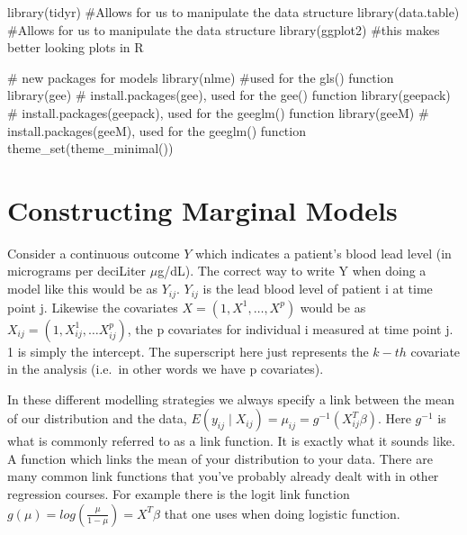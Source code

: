 \documentclass[
  letterpaper,
  DIV=11,
  numbers=noendperiod]{scrreprt}
\newenvironment{Shaded}{\begin{snugshade}}{\end{snugshade}}
\newcommand{\CommentTok}[1]{\textcolor[rgb]{0.37,0.37,0.37}{#1}}
\newcommand{\FunctionTok}[1]{\textcolor[rgb]{0.28,0.35,0.67}{#1}}
\newcommand{\NormalTok}[1]{\textcolor[rgb]{0.00,0.23,0.31}{#1}}
\begin{document}
\begin{Shaded}
\begin{Highlighting}[]
\FunctionTok{library}\NormalTok{(tidyr)  }\CommentTok{\#Allows for us to manipulate the data structure}
\FunctionTok{library}\NormalTok{(data.table)  }\CommentTok{\#Allows for us to manipulate the data structure}
\FunctionTok{library}\NormalTok{(ggplot2)  }\CommentTok{\#this makes better looking plots in R}

\CommentTok{\# new packages for models}
\FunctionTok{library}\NormalTok{(nlme)  }\CommentTok{\#used for the gls() function}
\FunctionTok{library}\NormalTok{(gee)  }\CommentTok{\# install.packages(\textquotesingle{}gee\textquotesingle{}), used for the gee() function}
\FunctionTok{library}\NormalTok{(geepack)  }\CommentTok{\# install.packages(\textquotesingle{}geepack\textquotesingle{}), used for the geeglm() function}
\FunctionTok{library}\NormalTok{(geeM)  }\CommentTok{\# install.packages(\textquotesingle{}geeM\textquotesingle{}), used for the geeglm() function}
\FunctionTok{theme\_set}\NormalTok{(}\FunctionTok{theme\_minimal}\NormalTok{())}
\end{Highlighting}
\end{Shaded}

\hypertarget{constructing-marginal-models}{%
\section{Constructing Marginal
Models}\label{constructing-marginal-models}}

Consider a continuous outcome \(Y\) which indicates a patient's blood
lead level (in micrograms per deciLiter \(\mu\)g/dL). The correct way to
write Y when doing a model like this would be as \(Y_{ij}\). \(Y_{ij}\)
is the lead blood level of patient i at time point j. Likewise the
covariates \(X = (1,X^1, \dots,X^p)\) would be as
\(X_{ij} = (1,X^1_{ij},\dots X^p_{ij})\), the p covariates for
individual i measured at time point j. 1 is simply the intercept. The
superscript here just represents the \(k-th\) covariate in the analysis
(i.e.~in other words we have p covariates).

In these different modelling strategies we always specify a link between
the mean of our distribution and the data,
\(E(y_{ij} \mid X_{ij}) = \mu_{ij} = g^{-1}(X^T_{ij}\beta)\). Here
\(g^{-1}\) is what is commonly referred to as a link function. It is
exactly what it sounds like. A function which links the mean of your
distribution to your data. There are many common link functions that
you've probably already dealt with in other regression courses. For
example there is the logit link function
\(g(\mu) =log(\frac{\mu}{1-\mu}) = X^T\beta\) that one uses when doing
logistic function.
\end{document}
